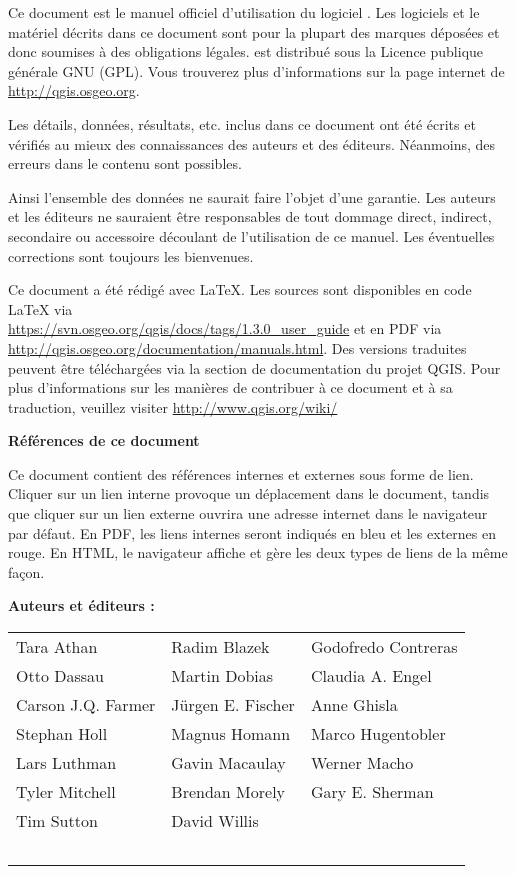 \frontmatter
\pagestyle{scrplain}
\vspace{1cm}
Ce document est le manuel officiel d'utilisation du logiciel \QG. Les logiciels et le matériel décrits dans ce document sont pour la plupart des marques déposées et donc soumises à des obligations légales. \QG est distribué sous la Licence publique générale GNU (GPL). Vous trouverez plus d'informations sur la page internet de \QG \url{http://qgis.osgeo.org}.
\par\bigskip
Les détails, données, résultats, etc. inclus dans ce document ont été écrits et vérifiés au mieux des connaissances des auteurs et des éditeurs. Néanmoins, des erreurs dans le contenu sont possibles.
\par\bigskip
Ainsi l'ensemble des données ne saurait faire l'objet d'une garantie. Les auteurs et les éditeurs ne sauraient être responsables de tout dommage direct, indirect, secondaire ou accessoire découlant de l'utilisation de ce manuel. Les éventuelles corrections sont toujours les bienvenues.
\par\bigskip
Ce document a été rédigé avec \LaTeX. Les sources sont disponibles en code \LaTeX{} via\\ \url{https://svn.osgeo.org/qgis/docs/tags/1.3.0_user_guide} et en PDF via \url{http://qgis.osgeo.org/documentation/manuals.html}. 
Des versions traduites peuvent être téléchargées via la section de documentation du projet QGIS. Pour plus d'informations sur les manières de contribuer à ce document et à sa traduction, veuillez visiter \url{http://www.qgis.org/wiki/} 

\vspace{1cm}
\noindent
\textbf{Références de ce document}
\par\bigskip
Ce document contient des références internes et externes sous forme de lien. Cliquer sur un lien interne provoque un déplacement dans le document, tandis que cliquer sur un lien externe ouvrira une adresse internet dans le navigateur par défaut. En PDF, les liens internes seront indiqués en bleu et les externes en rouge. En HTML, le navigateur affiche et gère les deux types de liens de la même fa\c{c}on.

\newpage

\begin{flushleft}
\textbf{Auteurs et éditeurs :}
 \par\bigskip\noindent
\begin{tabular}{p{4cm} p{4cm} p{4cm}}
Tara Athan & Radim Blazek & Godofredo Contreras   \\
 Otto Dassau & Martin Dobias & Claudia A. Engel \\ 
 Carson J.Q. Farmer &J\"urgen E. Fischer & Anne Ghisla \\
Stephan Holl &  Magnus Homann& Marco Hugentobler \\ 
 Lars Luthman & Gavin Macaulay & Werner Macho \\
  Tyler Mitchell & Brendan Morely&Gary E. Sherman\\
  Tim Sutton & David Willis \\ \
\end{tabular}
\end{flushleft}


